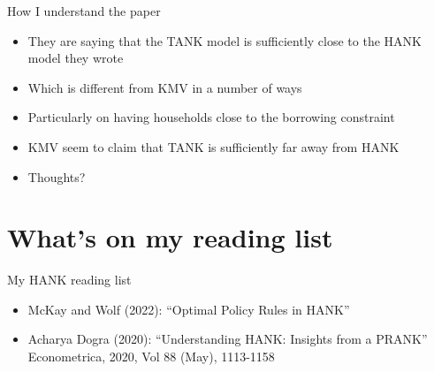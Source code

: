 \documentclass[english,xcolor=svgnames]{beamer}
\begin{document}
\begin{frame}{How I understand the paper}
\begin{itemize}
\item They are saying that the TANK model is sufficiently close to the HANK model they wrote
\item Which is different from KMV in a number of ways
\item Particularly on having households close to the borrowing constraint
\item KMV seem to claim that TANK is sufficiently far away from HANK
\item Thoughts?
\end{itemize}
\end{frame}

\section{What's on my reading list}
\begin{frame}{My HANK reading list}
	\begin{itemize}
	\item McKay and Wolf (2022): ``Optimal Policy Rules in HANK''
	\item Acharya Dogra (2020): ``Understanding HANK: Insights from a PRANK'' Econometrica, 2020, Vol 88 (May), 1113-1158\\
	\end{itemize}
\end{frame}
\end{document}
